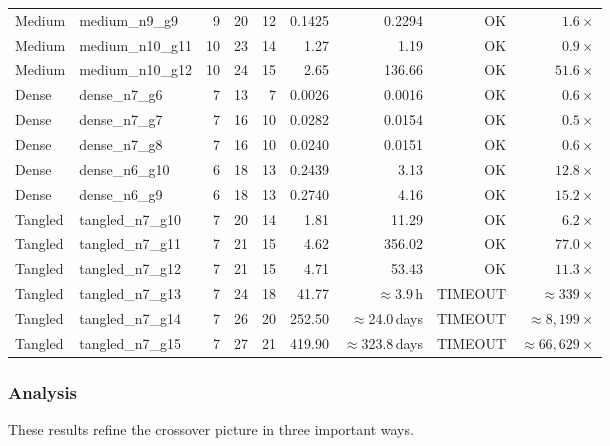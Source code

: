 \documentclass[acmsmall,review]{acmart}
\begin{document}
\begin{table}[H]
{\begin{tabular}{@{}llrrrrrrr@{}}
				Medium & medium\_n9\_g9   &  9 & 20 & 12 & 0.1425 & 0.2294  & OK & $1.6\times$ \\
				Medium & medium\_n10\_g11 & 10 & 23 & 14 & 1.27   & 1.19    & OK & $0.9\times$ \\
				\rowcolor{speedupyellow}
				Medium & medium\_n10\_g12 & 10 & 24 & 15 & 2.65   & 136.66  & OK & $51.6\times$ \\
				\midrule
				Dense  & dense\_n7\_g6    &  7 & 13 &  7 & 0.0026 & 0.0016  & OK & $0.6\times$ \\
				Dense  & dense\_n7\_g7    &  7 & 16 & 10 & 0.0282 & 0.0154  & OK & $0.5\times$ \\
				Dense  & dense\_n7\_g8    &  7 & 16 & 10 & 0.0240 & 0.0151  & OK & $0.6\times$ \\
				\rowcolor{speedupyellow}
				Dense  & dense\_n6\_g10   &  6 & 18 & 13 & 0.2439 & 3.13    & OK & $12.8\times$ \\
				\rowcolor{speedupyellow}
				Dense  & dense\_n6\_g9    &  6 & 18 & 13 & 0.2740 & 4.16    & OK & $15.2\times$ \\
				\midrule
				Tangled & tangled\_n7\_g10 &  7 & 20 & 14 & 1.81   & 11.29   & OK & $6.2\times$ \\
				\rowcolor{speedupyellow}
				Tangled & tangled\_n7\_g11 &  7 & 21 & 15 & 4.62   & 356.02  & OK & $77.0\times$ \\
				\rowcolor{speedupyellow}
				Tangled & tangled\_n7\_g12 &  7 & 21 & 15 & 4.71   & 53.43   & OK & $11.3\times$ \\
				\rowcolor{timeoutred}
				Tangled & tangled\_n7\_g13 &  7 & 24 & 18 & 41.77  & $\approx$3.9\,h   & TIMEOUT & $\approx$$339\times$ \\
				\rowcolor{timeoutred}
				Tangled & tangled\_n7\_g14 &  7 & 26 & 20 & 252.50 & $\approx$24.0\,days & TIMEOUT & $\approx$$8{,}199\times$ \\
				\rowcolor{timeoutred}
				Tangled & tangled\_n7\_g15 &  7 & 27 & 21 & 419.90 & $\approx$323.8\,days & TIMEOUT & $\approx$$66{,}629\times$ \\
				\bottomrule
			\end{tabular}%
		}
	\end{table}
	
	\subsubsection{Analysis}
	
	These results refine the crossover picture in three important ways.
	
\end{document}
